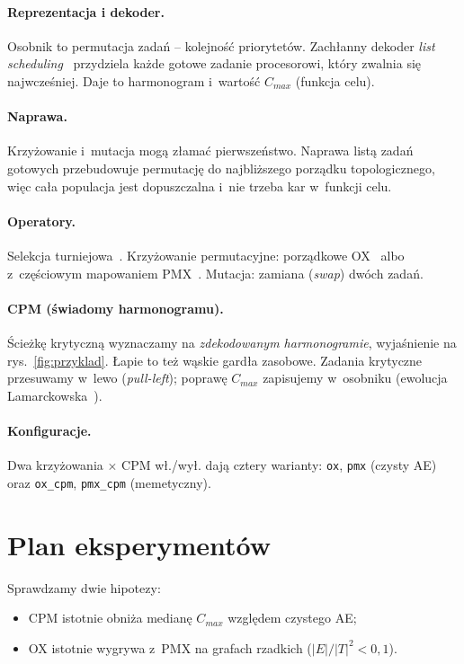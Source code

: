 \documentclass[12pt,a4paper]{article}
\begin{document}
\paragraph{Reprezentacja i dekoder.} Osobnik to permutacja zadań -- kolejność priorytetów.
Zachłanny dekoder \emph{list scheduling}~\cite{graham1969} przydziela każde gotowe zadanie
procesorowi, który zwalnia się najwcześniej. Daje to harmonogram i~wartość $C_{max}$ (funkcja celu).

\paragraph{Naprawa.} Krzyżowanie i~mutacja mogą złamać pierwszeństwo. Naprawa listą zadań gotowych
przebudowuje permutację do najbliższego porządku topologicznego, więc cała populacja jest
dopuszczalna i~nie trzeba kar w~funkcji celu.

\paragraph{Operatory.} Selekcja turniejowa~\cite{miller1995}. Krzyżowanie permutacyjne: porządkowe
OX~\cite{davis1985} albo z~częściowym mapowaniem PMX~\cite{goldberg1985}. Mutacja: zamiana
(\emph{swap}) dwóch zadań.

\paragraph{CPM (świadomy harmonogramu).} Ścieżkę krytyczną wyznaczamy na \emph{zdekodowanym
harmonogramie}, wyjaśnienie na rys.~\ref{fig:przyklad}. Łapie to też wąskie gardła zasobowe. Zadania krytyczne
przesuwamy w~lewo (\emph{pull-left}); poprawę $C_{max}$ zapisujemy w~osobniku (ewolucja
Lamarckowska~\cite{whitley1994}).

\paragraph{Konfiguracje.} Dwa krzyżowania $\times$ CPM wł./wył. dają cztery warianty:
\texttt{ox}, \texttt{pmx} (czysty AE) oraz \texttt{ox\_cpm}, \texttt{pmx\_cpm} (memetyczny).

\section{Plan eksperymentów}
\label{sec:eksperymenty}
Sprawdzamy dwie hipotezy:
\begin{itemize}[itemsep=1pt, topsep=2pt, leftmargin=3em]
    \item[(H1)] CPM istotnie obniża medianę $C_{max}$ względem czystego AE;
    \item[(H2)] OX istotnie wygrywa z~PMX na grafach rzadkich ($|E|/|T|^2 < 0{,}1$).
\end{itemize}
\end{document}
